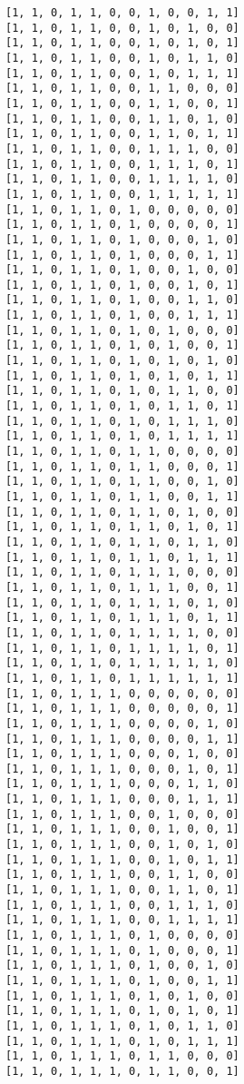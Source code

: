 \documentclass[11pt]{article}
\begin{document}
\begin{Verbatim}[commandchars=\\\{\}]
[1, 1, 0, 1, 1, 0, 0, 1, 0, 0, 1, 1]
[1, 1, 0, 1, 1, 0, 0, 1, 0, 1, 0, 0]
[1, 1, 0, 1, 1, 0, 0, 1, 0, 1, 0, 1]
[1, 1, 0, 1, 1, 0, 0, 1, 0, 1, 1, 0]
[1, 1, 0, 1, 1, 0, 0, 1, 0, 1, 1, 1]
[1, 1, 0, 1, 1, 0, 0, 1, 1, 0, 0, 0]
[1, 1, 0, 1, 1, 0, 0, 1, 1, 0, 0, 1]
[1, 1, 0, 1, 1, 0, 0, 1, 1, 0, 1, 0]
[1, 1, 0, 1, 1, 0, 0, 1, 1, 0, 1, 1]
[1, 1, 0, 1, 1, 0, 0, 1, 1, 1, 0, 0]
[1, 1, 0, 1, 1, 0, 0, 1, 1, 1, 0, 1]
[1, 1, 0, 1, 1, 0, 0, 1, 1, 1, 1, 0]
[1, 1, 0, 1, 1, 0, 0, 1, 1, 1, 1, 1]
[1, 1, 0, 1, 1, 0, 1, 0, 0, 0, 0, 0]
[1, 1, 0, 1, 1, 0, 1, 0, 0, 0, 0, 1]
[1, 1, 0, 1, 1, 0, 1, 0, 0, 0, 1, 0]
[1, 1, 0, 1, 1, 0, 1, 0, 0, 0, 1, 1]
[1, 1, 0, 1, 1, 0, 1, 0, 0, 1, 0, 0]
[1, 1, 0, 1, 1, 0, 1, 0, 0, 1, 0, 1]
[1, 1, 0, 1, 1, 0, 1, 0, 0, 1, 1, 0]
[1, 1, 0, 1, 1, 0, 1, 0, 0, 1, 1, 1]
[1, 1, 0, 1, 1, 0, 1, 0, 1, 0, 0, 0]
[1, 1, 0, 1, 1, 0, 1, 0, 1, 0, 0, 1]
[1, 1, 0, 1, 1, 0, 1, 0, 1, 0, 1, 0]
[1, 1, 0, 1, 1, 0, 1, 0, 1, 0, 1, 1]
[1, 1, 0, 1, 1, 0, 1, 0, 1, 1, 0, 0]
[1, 1, 0, 1, 1, 0, 1, 0, 1, 1, 0, 1]
[1, 1, 0, 1, 1, 0, 1, 0, 1, 1, 1, 0]
[1, 1, 0, 1, 1, 0, 1, 0, 1, 1, 1, 1]
[1, 1, 0, 1, 1, 0, 1, 1, 0, 0, 0, 0]
[1, 1, 0, 1, 1, 0, 1, 1, 0, 0, 0, 1]
[1, 1, 0, 1, 1, 0, 1, 1, 0, 0, 1, 0]
[1, 1, 0, 1, 1, 0, 1, 1, 0, 0, 1, 1]
[1, 1, 0, 1, 1, 0, 1, 1, 0, 1, 0, 0]
[1, 1, 0, 1, 1, 0, 1, 1, 0, 1, 0, 1]
[1, 1, 0, 1, 1, 0, 1, 1, 0, 1, 1, 0]
[1, 1, 0, 1, 1, 0, 1, 1, 0, 1, 1, 1]
[1, 1, 0, 1, 1, 0, 1, 1, 1, 0, 0, 0]
[1, 1, 0, 1, 1, 0, 1, 1, 1, 0, 0, 1]
[1, 1, 0, 1, 1, 0, 1, 1, 1, 0, 1, 0]
[1, 1, 0, 1, 1, 0, 1, 1, 1, 0, 1, 1]
[1, 1, 0, 1, 1, 0, 1, 1, 1, 1, 0, 0]
[1, 1, 0, 1, 1, 0, 1, 1, 1, 1, 0, 1]
[1, 1, 0, 1, 1, 0, 1, 1, 1, 1, 1, 0]
[1, 1, 0, 1, 1, 0, 1, 1, 1, 1, 1, 1]
[1, 1, 0, 1, 1, 1, 0, 0, 0, 0, 0, 0]
[1, 1, 0, 1, 1, 1, 0, 0, 0, 0, 0, 1]
[1, 1, 0, 1, 1, 1, 0, 0, 0, 0, 1, 0]
[1, 1, 0, 1, 1, 1, 0, 0, 0, 0, 1, 1]
[1, 1, 0, 1, 1, 1, 0, 0, 0, 1, 0, 0]
[1, 1, 0, 1, 1, 1, 0, 0, 0, 1, 0, 1]
[1, 1, 0, 1, 1, 1, 0, 0, 0, 1, 1, 0]
[1, 1, 0, 1, 1, 1, 0, 0, 0, 1, 1, 1]
[1, 1, 0, 1, 1, 1, 0, 0, 1, 0, 0, 0]
[1, 1, 0, 1, 1, 1, 0, 0, 1, 0, 0, 1]
[1, 1, 0, 1, 1, 1, 0, 0, 1, 0, 1, 0]
[1, 1, 0, 1, 1, 1, 0, 0, 1, 0, 1, 1]
[1, 1, 0, 1, 1, 1, 0, 0, 1, 1, 0, 0]
[1, 1, 0, 1, 1, 1, 0, 0, 1, 1, 0, 1]
[1, 1, 0, 1, 1, 1, 0, 0, 1, 1, 1, 0]
[1, 1, 0, 1, 1, 1, 0, 0, 1, 1, 1, 1]
[1, 1, 0, 1, 1, 1, 0, 1, 0, 0, 0, 0]
[1, 1, 0, 1, 1, 1, 0, 1, 0, 0, 0, 1]
[1, 1, 0, 1, 1, 1, 0, 1, 0, 0, 1, 0]
[1, 1, 0, 1, 1, 1, 0, 1, 0, 0, 1, 1]
[1, 1, 0, 1, 1, 1, 0, 1, 0, 1, 0, 0]
[1, 1, 0, 1, 1, 1, 0, 1, 0, 1, 0, 1]
[1, 1, 0, 1, 1, 1, 0, 1, 0, 1, 1, 0]
[1, 1, 0, 1, 1, 1, 0, 1, 0, 1, 1, 1]
[1, 1, 0, 1, 1, 1, 0, 1, 1, 0, 0, 0]
[1, 1, 0, 1, 1, 1, 0, 1, 1, 0, 0, 1]

\end{Verbatim}
\end{document}
